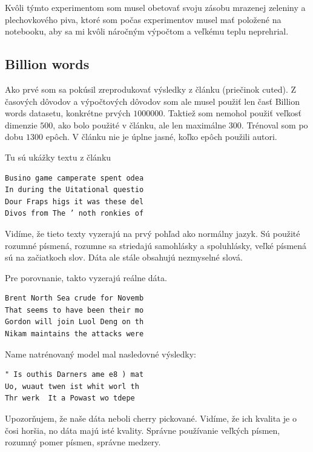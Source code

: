 \documentclass[10pt,a4paper]{article}
\begin{document}
Kvôli týmto experimentom som musel obetovať svoju zásobu mrazenej zeleniny a plechovkového piva, ktoré som počas experimentov musel mať položené na notebooku, aby sa mi kvôli náročným výpočtom a veľkému teplu neprehrial.


\subsection{Billion words}

Ako prvé som sa pokúsil zreprodukovať výsledky z článku (priečinok cuted). Z časových dôvodov a výpočtových dôvodov som ale musel použiť len časť Billion words datasetu, konkrétne prvých $1000000$. Taktiež som nemohol použiť veľkosť dimenzie $500$, ako bolo použité v článku, ale len maximálne $300$. 
Trénoval som po dobu $1300$ epôch. V článku nie je úplne jasné, koľko epôch použili autori.

Tu sú ukážky textu z článku
\begin{verbatim}
Busino game camperate spent odea
In during the Uitational questio       
Dour Fraps higs it was these del
Divos from The ’ noth ronkies of
\end{verbatim}

Vidíme, že tieto texty vyzerajú na prvý pohľad ako normálny jazyk. 
Sú použité rozumné písmená, rozumne sa striedajú samohlásky a spoluhlásky, veľké písmená sú na začiatkoch slov.
Dáta ale stále obsahujú nezmyselné slová.

Pre porovnanie, takto vyzerajú reálne dáta.
\begin{verbatim}
Brent North Sea crude for Novemb
That seems to have been their mo
Gordon will join Luol Deng on th
Nikam maintains the attacks were
\end{verbatim}

Name natrénovaný model mal nasledovné výsledky:
\begin{verbatim}
" Is outhis Darners ame e8 ) mat
Uo‚ wuaut twen ist whit worl th
Thr werk  It a Powast wo tdepe 
\end{verbatim}

Upozorňujem, že naše dáta neboli cherry pickované. Vidíme, že ich kvalita je o čosi horšia, no dáta majú isté kvality. 
Správne používanie veľkých písmen, rozumný pomer písmen, správne medzery.
\end{document}
